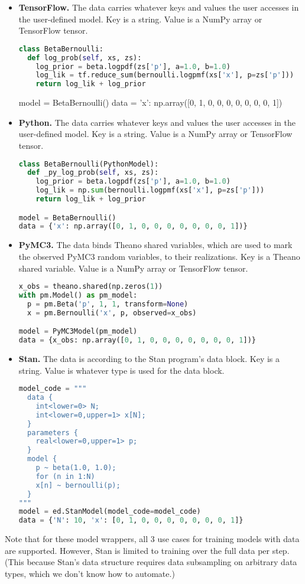 \begin{itemize}
\item
   \textbf{TensorFlow.} The data carries whatever keys and values the user
   accesses in the user-defined model. Key is a string. Value is a NumPy
   array or TensorFlow tensor.

\begin{lstlisting}[language=Python]
class BetaBernoulli:
  def log_prob(self, xs, zs):
    log_prior = beta.logpdf(zs['p'], a=1.0, b=1.0)
    log_lik = tf.reduce_sum(bernoulli.logpmf(xs['x'], p=zs['p']))
    return log_lik + log_prior
\end{lstlisting}

  model = BetaBernoulli()
  data = {'x': np.array([0, 1, 0, 0, 0, 0, 0, 0, 0, 1])}
\item
   \textbf{Python.} The data carries whatever keys and values the user
   accesses in the user-defined model. Key is a string. Value is a NumPy
   array or TensorFlow tensor.

\begin{lstlisting}[language=Python]
class BetaBernoulli(PythonModel):
  def _py_log_prob(self, xs, zs):
    log_prior = beta.logpdf(zs['p'], a=1.0, b=1.0)
    log_lik = np.sum(bernoulli.logpmf(xs['x'], p=zs['p']))
    return log_lik + log_prior

model = BetaBernoulli()
data = {'x': np.array([0, 1, 0, 0, 0, 0, 0, 0, 0, 1])}
\end{lstlisting}
\item
   \textbf{PyMC3.} The data binds Theano shared variables, which are used to
   mark the observed PyMC3 random variables, to their realizations. Key
   is a Theano shared variable. Value is a NumPy array or TensorFlow
   tensor.

\begin{lstlisting}[language=Python]
x_obs = theano.shared(np.zeros(1))
with pm.Model() as pm_model:
  p = pm.Beta('p', 1, 1, transform=None)
  x = pm.Bernoulli('x', p, observed=x_obs)

model = PyMC3Model(pm_model)
data = {x_obs: np.array([0, 1, 0, 0, 0, 0, 0, 0, 0, 1])}
\end{lstlisting}
\item
   \textbf{Stan.} The data is according to the Stan program's data block. Key
   is a string. Value is whatever type is used for the data block.

\begin{lstlisting}[language=Python]
model_code = """
  data {
    int<lower=0> N;
    int<lower=0,upper=1> x[N];
  }
  parameters {
    real<lower=0,upper=1> p;
  }
  model {
    p ~ beta(1.0, 1.0);
    for (n in 1:N)
    x[n] ~ bernoulli(p);
  }
"""
model = ed.StanModel(model_code=model_code)
data = {'N': 10, 'x': [0, 1, 0, 0, 0, 0, 0, 0, 0, 1]}
\end{lstlisting}
\end{itemize}

Note that for these model wrappers,
all 3 use cases for training models with data are supported. However,
Stan is limited to training over the full data per step. (This
because Stan's data structure requires data subsampling on arbitrary
data types, which we don't know how to automate.)

